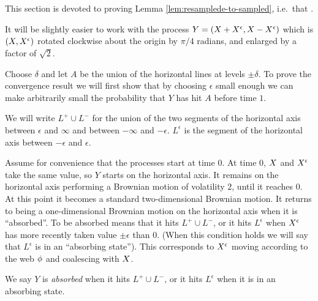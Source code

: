 {
\section{}
\label{sec:proof-of-lem:resamplede-to-sampled}

\newcommand{\bandwidth}{\delta}
\newcommand{\rotproc}{Y}

\newcommand{\union}{\cup}
\renewcommand{\L}{L^+ \union L^-}
\newcommand{\Le}{L^\epsilon}

This section is devoted to proving Lemma
\ref{lem:resamplede-to-sampled}, i.e.\ that
\statementoflemresampledetosampled.

It will be slightly easier to work with the process $\rotproc =
(\sampled + \resamplede, \sampled - \resamplede)$ which is $(X,
X^{\epsilon})$ rotated clockwise about the origin by $\pi / 4$ radians, and enlarged by a factor of
$\sqrt{2}$.

\newcommand{\boundarylines}{A}

Choose $\delta$ and let $\boundarylines$ be the union of the
horizontal lines at levels $\pm\delta$.  To prove the convergence
result we will first show that by choosing $\epsilon$ small enough we
can make arbitrarily small the probability that $\rotproc$ has hit
$\boundarylines$ before time $1$.

We will write $\L$ for the union of the two segments of the horizontal
axis between $\epsilon$ and $\infty$ and between $-\infty$ and
$-\epsilon$.  $\Le$ is the segment of the horizontal axis between
$-\epsilon$ and $\epsilon$.

Assume for convenience that the processes start at time $0$.  At time
$0$, $X$ and $X^{\epsilon}$ take the same value, so $\rotproc$
starts on the horizontal axis.  It remains on the horizontal axis
performing a Brownian motion of volatility $2$, until it reaches $0$.
At this point it becomes a standard two-dimensional Brownian motion.
It returns to being a one-dimensional Brownian motion on the
horizontal axis when it is ``absorbed''.  To be absorbed means that it
hits $\L$, or it hits $\Le$ when $X^{\epsilon}$ has more recently taken
value $\pm\epsilon$ than $0$.  (When this condition holds we will say
that $\Le$ is in an ``absorbing state'').  This corresponds to
$X^{\epsilon}$ moving according to the web $\phi$ and coalescing
with $X$.

\begin{definition}
  We say $Y$ is \emph{absorbed} when it hits $\L$, or it hits $\Le$
  when it is in an absorbing state.
\end{definition}

}
